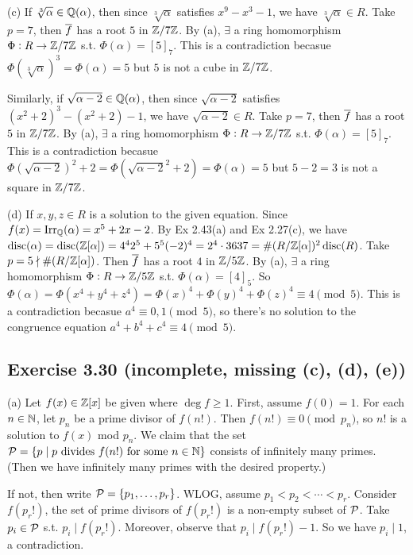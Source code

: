 \documentclass[../Marcus.tex]{subfiles}
\begin{document}
(c) If $\sqrt[3]{\alpha}\in\mathbb{Q}(\alpha)$, then since $\sqrt[3]{\alpha}$ satisfies $x^9-x^3-1$, we have $\sqrt[3]{\alpha}\in R$. Take $p=7$, then $\overline{f}$ has a root $5$ in $\mathbb{Z}/7\mathbb{Z}$. By (a), $\exists$ a ring homomorphism $\Phi:R\to\mathbb{Z}/7\mathbb{Z}$ s.t. $\Phi(\alpha)=[5]_7$. This is a contradiction becasue $\Phi(\sqrt[3]{\alpha})^3=\Phi(\alpha)=5$ but $5$ is not a cube in $\mathbb{Z}/7\mathbb{Z}$.

Similarly, if $\sqrt{\alpha-2}\in\mathbb{Q}(\alpha)$, then since $\sqrt{\alpha-2}$ satisfies $(x^2+2)^3-(x^2+2)-1$, we have $\sqrt{\alpha-2}\in R$. Take $p=7$, then $\overline{f}$ has a root $5$ in $\mathbb{Z}/7\mathbb{Z}$. By (a), $\exists$ a ring homomorphism $\Phi:R\to\mathbb{Z}/7\mathbb{Z}$ s.t. $\Phi(\alpha)=[5]_7$. This is a contradiction becasue $\Phi(\sqrt{\alpha-2})^2+2=\Phi(\sqrt{\alpha-2}^2+2)=\Phi(\alpha)=5$ but $5-2=3$ is not a square in $\mathbb{Z}/7\mathbb{Z}$.

(d) If $x,y,z\in R$ is a solution to the given equation. Since $f(x)=\operatorname{Irr}_{\mathbb{Q}}(\alpha)=x^5+2x-2$. By Ex 2.43(a) and Ex 2.27(c), we have $\operatorname{disc}(\alpha)=\operatorname{disc}(\mathbb{Z}[\alpha])=4^42^5+5^5(-2)^4=2^4\cdot 3637=\#(R/\mathbb{Z}[\alpha])^2\operatorname{disc}(R)$. Take $p=5\nmid \#(R/\mathbb{Z}[\alpha])$. Then $\overline{f}$ has a root $4$ in $\mathbb{Z}/5\mathbb{Z}$. By (a), $\exists$ a ring homomorphism $\Phi:R\to\mathbb{Z}/5\mathbb{Z}$ s.t. $\Phi(\alpha)=[4]_5$. So $\Phi(\alpha)=\Phi(x^4+y^4+z^4)=\Phi(x)^4+\Phi(y)^4+\Phi(z)^4\equiv 4\pmod{5}$. This is a contradiction becasue $a^4\equiv 0,1 \pmod{5}$, so there's no solution to the congruence equation $a^4+b^4+c^4\equiv 4\pmod{5}$.

\subsection*{Exercise 3.30 \color{red}(incomplete, missing (c), (d), (e))}

(a) Let $f(x)\in\mathbb{Z}[x]$ be given where $\deg f\geq1$. First, assume $f(0)=1$. For each $n\in\mathbb{N}$, let $p_n$ be a prime divisor of $f(n!)$. Then $f(n!)\equiv 0 \pmod{p_n}$, so $n!$ is a solution to $f(x)$ mod $p_n$. We claim that the set $\mathcal{P}=\{ p \mid p \text{ divides } f(n!) \text{ for some } n\in\mathbb{N}\}$ consists of infinitely many primes. (Then we have infinitely many primes with the desired property.)

If not, then write $\mathcal{P}=\{p_1,\ldots,p_r\}$. WLOG, assume $p_1<p_2<\cdots<p_r$. Consider $f(p_r!)$, the set of prime divisors of $f(p_r!)$ is a non-empty subset of $\mathcal{P}$. Take $p_i\in\mathcal{P}$ s.t. $p_i\mid f(p_r!)$. Moreover, observe that $p_i\mid f(p_r!)-1$. So we have $p_i\mid 1$, a contradiction.
\end{document}
